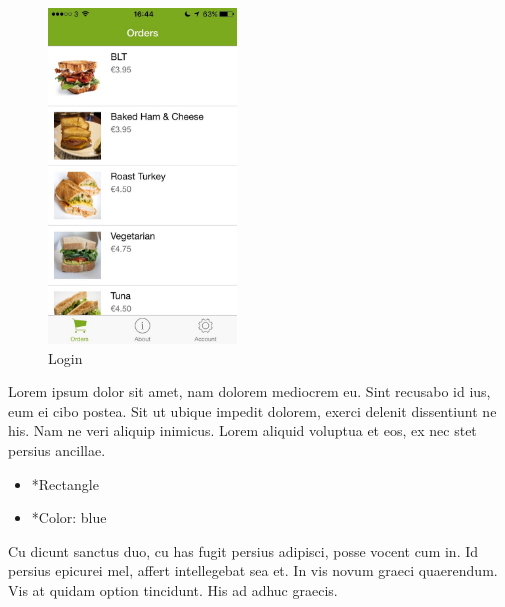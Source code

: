 \begin{minipage}{5cm}
	\begin{figure}[H]
		\includegraphics[width=5cm]{img/mobile-app/screen-shots/IMG_2907.jpg}
		\caption{Login}
	\end{figure}
\end{minipage} \hfill
\begin{minipage}{0.55\textwidth}
	Lorem ipsum dolor sit amet, nam dolorem mediocrem eu. Sint recusabo id ius, eum ei cibo postea. Sit ut ubique impedit dolorem, exerci delenit dissentiunt ne his. Nam ne veri aliquip inimicus. Lorem aliquid voluptua et eos, ex nec stet persius ancillae.
	\begin{itemize}
		\item *Rectangle
		\item *Color: blue
	\end{itemize}
	Cu dicunt sanctus duo, cu has fugit persius adipisci, posse vocent cum in. Id persius epicurei mel, affert intellegebat sea et. In vis novum graeci quaerendum. Vis at quidam option tincidunt. His ad adhuc graecis.
\end{minipage}

